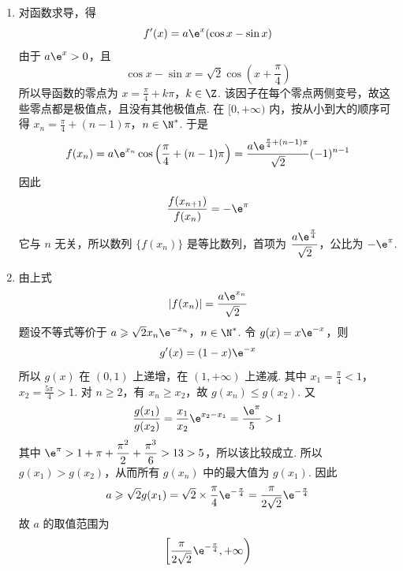 \begin{solution}
\begin{enumerate}
\item 对函数求导，得
\[
f'(x)=a\e^{x}(\cos x-\sin x)
\]
由于 \(a\e^{x}>0\)，且
\[
\cos x-\sin x=\sqrt{2}\cos\left(x+\frac{\pi}{4}\right)
\]
所以导函数的零点为
\(x=\frac{\pi}{4}+k\pi\)，\(k\in\Z\).
该因子在每个零点两侧变号，故这些零点都是极值点，且没有其他极值点. 在 \([0,+\infty)\) 内，按从小到大的顺序可得
\(x_{n}=\frac{\pi}{4}+(n-1)\pi\)，\(n\in\N^{*}\).
于是
\[
f(x_{n})=a\e^{x_{n}}\cos\left(\frac{\pi}{4}+(n-1)\pi\right)
 =\frac{a\e^{\frac{\pi}{4}+(n-1)\pi}}{\sqrt{2}}(-1)^{n-1}
\]
因此
\[
\frac{f(x_{n+1})}{f(x_{n})}=-\e^{\pi}
\]
它与 \(n\) 无关，所以数列 \(\{f(x_{n})\}\) 是等比数列，首项为 \(\dfrac{a\e^{\frac{\pi}{4}}}{\sqrt{2}}\)，公比为 \(-\e^{\pi}\).

\item 由上式
\[
|f(x_{n})|=\frac{a\e^{x_{n}}}{\sqrt{2}}
\]
题设不等式等价于
\(a\geqslant\sqrt{2}x_{n}\e^{-x_{n}}\)，\(n\in\N^{*}\).
令 \(g(x)=x\e^{-x}\)，则
\[
g'(x)=(1-x)\e^{-x}
\]
所以 \(g(x)\) 在 \((0,1)\) 上递增，在 \((1,+\infty)\) 上递减. 其中
\(x_{1}=\frac{\pi}{4}<1\)，\(x_{2}=\frac{5\pi}{4}>1\).
对 \(n\geqslant2\)，有 \(x_n\geqslant x_2\)，故 \(g(x_n)\leqslant g(x_2)\). 又
\[
\frac{g(x_{1})}{g(x_{2})}
 =\frac{x_{1}}{x_{2}}\e^{x_{2}-x_{1}}
 =\frac{\e^{\pi}}{5}>1
\]
其中 \(\e^{\pi}>1+\pi+\dfrac{\pi^{2}}{2}+\dfrac{\pi^{3}}{6}>13>5\)，所以该比较成立.
所以 \(g(x_{1})>g(x_{2})\)，从而所有 \(g(x_n)\) 中的最大值为 \(g(x_1)\). 因此
\[
a\geqslant\sqrt{2}g(x_{1})
 =\sqrt{2}\times\frac{\pi}{4}\e^{-\frac{\pi}{4}}
 =\frac{\pi}{2\sqrt{2}}\e^{-\frac{\pi}{4}}
\]
故 \(a\) 的取值范围为
\[
\left[\frac{\pi}{2\sqrt{2}}\e^{-\frac{\pi}{4}},+\infty\right)
\]
\end{enumerate}
\end{solution}
